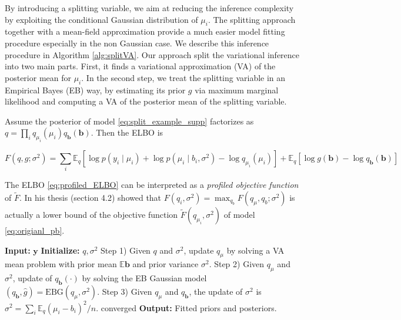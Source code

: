 By introducing a splitting variable, we aim at reducing the inference complexity by  exploiting the conditional Gaussian distribution of $\mu_{i }$. The splitting approach    together with a
mean-field approximation provide a much easier model fitting procedure especially in the  non Gaussian case. We describe this inference procedure in Algorithm \ref{alg:splitVA}.  Our approach  split the variational inference into two main parts. First, it finds a variational approximation (VA) of the  posterior  mean for $\mu_{i }$. In the second step, we treat the splitting variable in an Empirical Bayes (EB) way, by  estimating its  prior $g$   via maximum marginal likelihood and computing  a VA of the  posterior  mean of the splitting variable.
 
 

 
Assume the posterior of model \ref{eq:split_example_supp} factorizes as $q = \prod_i q_{\mu_{i }}(\mu_{i }) q_{\mathbf{b}}(\mathbf{b})$. Then the ELBO is


\begin{equation}\label{eq:profiled_ELBO}
    F(q,g;\sigma^2)
    = \sum_i \mathbb{E}_{q}\!\left[
        \log p(y_i\mid\mu_i)+\log p(\mu_i\mid b_i,\sigma^2)
        -\log q_{\mu_i}(\mu_i)
      \right]
      +\mathbb{E}_{q}\!\left[
        \log g(\mathbf b)-\log q_{\mathbf b}(\mathbf b)
      \right]
\end{equation}


The ELBO \ref{eq:profiled_ELBO} can be interpreted as  a
 \textit{profiled objective function} of $\tilde{F}$. In his thesis (section 4.2)   \cite{xie_empirical_2023}  showed that  $F(q_{i}, \sigma^2) = \max_{q_b} F(q_{\mu}, q_b; \sigma^2)$ is actually a lower bound of the objective function $\tilde{F}(q_{\mu_i},\sigma^2)$ of model \ref{eq:origianl_pb}.

\begin{algorithm}
\caption{Splitting Variational Inference for Poisson mean }\label{alg:splitVA}
\begin{algorithmic} 
\STATE \textbf{Input:} $\mathbf{y}$
\STATE \textbf{Initialize:} $q, \sigma^2$
\REPEAT 
    \STATE Step 1) Given $q$ and $\sigma^2$, update $q_{\mu}$ by solving a VA mean problem with prior mean $\mathbb{E} \mathbf{b}$ and prior variance $\sigma^2$.
    \STATE Step 2) Given $q_{\mu}$ and $\sigma^2$, update of $q_{\mathbf{b}}(\cdot)$ by solving the EB Gaussian model $(q_{\mathbf{b}}, \hat{g}) = \text{EBG}(q_{\mu}, \sigma^2)$.
    \STATE Step 3) Given $q_{\mu}$ and $q_{\mathbf{b}}$, the update of $\sigma^2$ is $\sigma^2 = \sum_i \mathbb{E}_{q} (\mu_{i } - b_i)^2 / n$.
\UNTIL converged
\STATE \textbf{Output:} Fitted priors and posteriors.
\end{algorithmic}
\end{algorithm}



